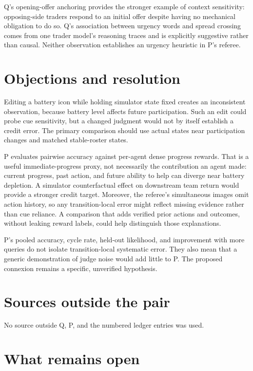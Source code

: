 \documentclass{article}
\begin{document}
Q's opening-offer anchoring provides the stronger example of context sensitivity: opposing-side traders respond to an initial offer despite having no mechanical obligation to do so. Q's association between urgency words and spread crossing comes from one trader model's reasoning traces and is explicitly suggestive rather than causal. Neither observation establishes an urgency heuristic in P's referee. 

\section{Objections and resolution}

Editing a battery icon while holding simulator state fixed creates an inconsistent observation, because battery level affects future participation. Such an edit could probe cue sensitivity, but a changed judgment would not by itself establish a credit error. The primary comparison should use actual states near participation changes and matched stable-roster states. 

P evaluates pairwise accuracy against per-agent dense progress rewards. That is a useful immediate-progress proxy, not necessarily the contribution an agent made: current progress, past action, and future ability to help can diverge near battery depletion. A simulator counterfactual effect on downstream team return would provide a stronger credit target. Moreover, the referee's simultaneous images omit action history, so any transition-local error might reflect missing evidence rather than cue reliance. A comparison that adds verified prior actions and outcomes, without leaking reward labels, could help distinguish those explanations. 

P's pooled accuracy, cycle rate, held-out likelihood, and improvement with more queries do not isolate transition-local systematic error. They also mean that a generic demonstration of judge noise would add little to P. The proposed connexion remains a specific, unverified hypothesis. 

\section{Sources outside the pair}

No source outside Q, P, and the numbered ledger entries was used.

\section{What remains open}
\end{document}
